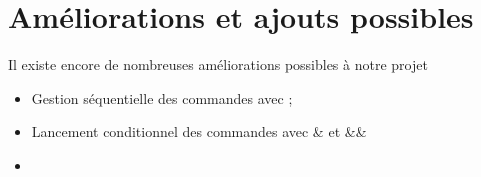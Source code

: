 \documentclass[fr]{article}
\begin{document}
\section{Améliorations et ajouts possibles}
Il existe encore de nombreuses améliorations possibles à notre projet

\begin{itemize}
  \item Gestion séquentielle des commandes avec ;
  \item Lancement conditionnel des commandes avec \& et \&\&
  \item 
\end{itemize}
\end{document}

